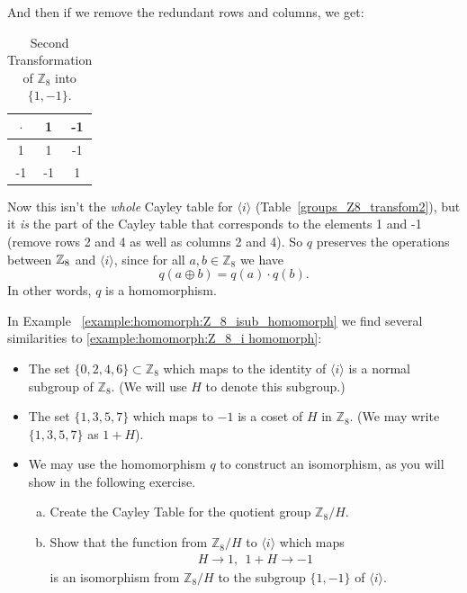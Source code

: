 \begin{example}
And then if we remove the redundant rows and columns, we get:

\begin{table}[H]
\caption{\label{1,-1_Z8_transfom2}Second Transformation of ${\mathbb Z}_8$ into $\{1,-1\}$.}{\small
\begin{center}
\begin{tabular}{c|cc}
$\cdot$ & 1 & -1  \\
\hline
1        & 1 & -1  \\
-1       & -1 & 1 \\
\end{tabular}
\end{center}
}
\end{table}

Now this isn't the \emph{whole} Cayley table for $\langle i \rangle$ (Table~\ref{groups_Z8_transfom2}), but it \emph{is} the part of the Cayley table that corresponds to the elements 1 and -1 (remove rows 2 and 4 as well as columns 2 and 4).  So $q$  preserves the operations between $\mathbb{Z}_8$ and $\langle i \rangle$, since for all $a,b \in {\mathbb Z}_8$ we have
\[
q(a \oplus b) = q(a) \cdot q(b).
\]
In other words, $q$ is a homomorphism.
\end{example}

In Example ~\ref{example:homomorph:Z_8_isub_homomorph} we find several similarities to \ref{example:homomorph:Z_8_i homomorph}:

\begin{itemize}
\item
The set $\{0,2,4,6\} \subset {\mathbb Z}_8$ which maps to  the identity of $\langle i \rangle$ is a  normal subgroup of  ${\mathbb Z}_8$. (We will use $H$ to denote this subgroup.)
\item
The set $\{1,3,5,7\}$ which maps to $-1$  is a coset of $H$ in ${\mathbb Z}_8$. (We may write $\{1,3,5,7\}$ as $1+H$).

\item
We may use the homomorphism $q$ to construct an isomorphism, as you will show in the following exercise.

\begin{exercise}\label{exercise:homomorph:Z8/0246_1-1_iso}
\begin{enumerate}[(a)]
\item
Create the Cayley Table for the quotient group ${\mathbb Z}_8/ H$.
\item
Show that the function from ${\mathbb Z}_8/ H$  to $\langle i \rangle$  which maps
\begin{align*}
   H \longrightarrow 1 ,~~     1+H \longrightarrow -1
\end{align*}
is an isomorphism from ${\mathbb Z}_8/ H$ to the subgroup $\{1,-1\}$ of $ \langle i \rangle$.
\end{enumerate}
\end{exercise}

\end{itemize}


